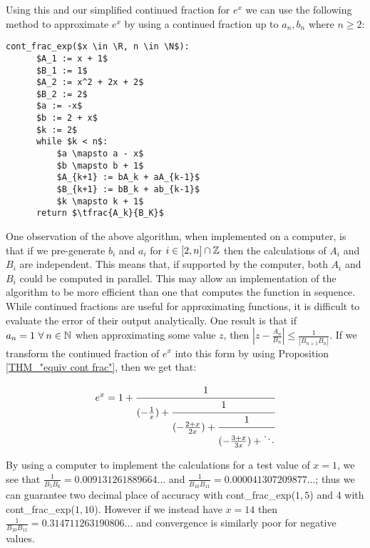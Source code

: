 Using this and our simplified continued fraction for \(e^x\) we can use the following method to approximate \(e^x\) by using a continued fraction up to \(a_n,b_n\) where \(n \ge 2\):
 
\begin{lstlisting}[caption={Continued fraction for \(e^x\)},label={PCD_"cont exp v1"}]
  cont_frac_exp($x \in \R, n \in \N$):
      $A_1 := x + 1$
      $B_1 := 1$
      $A_2 := x^2 + 2x + 2$
      $B_2 := 2$
      $a := -x$
      $b := 2 + x$
      $k := 2$
      while $k < n$:
          $a \mapsto a - x$
          $b \mapsto b + 1$
          $A_{k+1} := bA_k + aA_{k-1}$
          $B_{k+1} := bB_k + ab_{k-1}$
          $k \mapsto k + 1$
      return $\tfrac{A_k}{B_K}$
\end{lstlisting}

One observation of the above algorithm, when implemented on a computer, is that if we pre-generate \(b_i\) and \(a_i\) for \(i \in [2, n]\cap \mathbb{Z}\) then the calculations of \(A_i\) and \(B_i\) are independent. This means that, if supported by the computer, both \(A_i\) and \(B_i\) could be computed in parallel. This may allow an implementation of the algorithm to be more efficient than one that computes the function in sequence.\\

While continued fractions are useful for approximating functions, it is difficult to evaluate the error of their output analytically. One result is that if \(a_n = 1\ \forall\: n \in \mathbb{N}\) when approximating some value \(z\), then \(|z - \tfrac{A_n}{B_n}| \le \frac{1}{|B_{n+1}B_n|}\)\cite{BOK_ContFrac}. If we transform the continued fraction of \(e^x\) into this form by using Proposition \ref{THM_"equiv cont frac"}, then we get that:

\begin{displaymath}
	e^x = 1 + \cfrac{1}{(-\tfrac{1}{x}) + 
			  \cfrac{1}{(-\frac{2+x}{2x}) +
			  \cfrac{1}{(-\frac{3+x}{3x}) + \ddots } } }
\end{displaymath}

By using a computer to implement the calculations for a test value of \(x = 1\), we see that \(\frac{1}{B_5B_6} = 0.009131261889664\ldots\) and \(\frac{1}{B_{10}B_{11}} = 0.000041307209877\ldots\); thus we can guarantee two decimal place of accuracy with \textrm{cont\_frac\_exp(\(1, 5\))} and 4 with \textrm{cont\_frac\_exp(\(1, 10\))}. However if we instead have \(x = 14\) then \(\frac{1}{B_{10}B_{11}} = 0.314711263190806\ldots\) and convergence is similarly poor for negative values.\\
 
